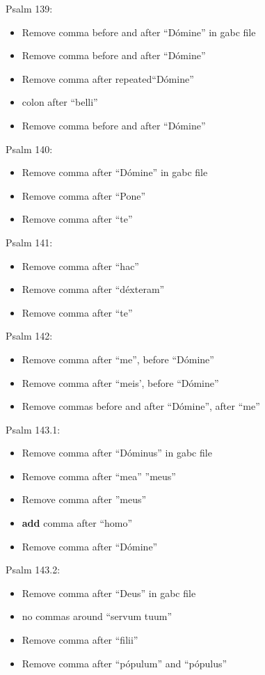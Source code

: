 \documentclass[11pt]{article}
\begin{document}
Psalm 139:
  \begin{itemize}
  \item Remove comma before and after ``Dómine'' in gabc file
  \item  Remove comma before and after ``Dómine'' 
  \item  Remove comma after repeated``Dómine'' 
 \item colon after ``belli''
  \item Remove comma before and after ``Dómine'' 
    \end{itemize}

Psalm 140:
  \begin{itemize}
  \item  Remove comma after ``Dómine'' in gabc file
  \item  Remove comma after ``Pone''
 \item
 Remove comma after ``te''
    \end{itemize}

Psalm 141:
  \begin{itemize}
  \item Remove comma after ``hac''
  \item  Remove comma after ``déxteram''
    \item  Remove comma after ``te''

    \end{itemize}
    
    Psalm 142:
  \begin{itemize}
  \item
  Remove comma after ``me'', before ``Dómine''
  \item
  Remove comma after ``meis', before ``Dómine''
    \item
  Remove commas before and after ``Dómine'', after ``me''
  \end{itemize}

      Psalm 143.1:
  \begin{itemize}
  \item Remove comma after ``Dóminus'' in gabc file
  \item  Remove comma after ``mea'' ''meus''
    \item  Remove comma after ''meus''
    \item
    \textbf{add} comma after ``homo''
      \item  Remove comma after ``Dómine'' 
    \end{itemize}

 Psalm 143.2:
  \begin{itemize}
  \item Remove comma after ``Deus'' in gabc file
    \item  no commas around ``servum tuum''
      \item Remove comma after ``filii'' 
   \item Remove comma after ``pópulum'' and ``pópulus'' 
    \end{itemize}
\end{document}
